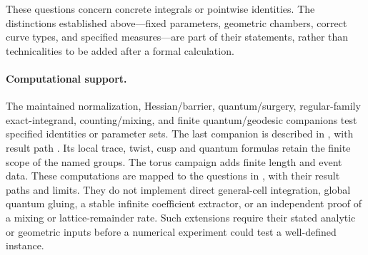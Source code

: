 These questions concern concrete integrals or pointwise identities. The
distinctions established above---fixed parameters, geometric chambers,
correct curve types, and specified measures---are part of their statements,
rather than technicalities to be added after a formal calculation.

\paragraph{Computational support.}
The maintained normalization, Hessian/barrier, quantum/surgery,
regular-family exact-integrand, counting/mixing, and finite
quantum/geodesic companions test specified identities or parameter sets.
The last companion is described in
, with result path
. Its local trace, twist,
cusp and quantum formulas retain the finite scope of the named groups.
The torus campaign adds
finite length and event data. These computations are mapped to the
questions in , with their result
paths and limits. They do not implement direct general-cell integration,
global quantum gluing, a stable infinite coefficient extractor, or an
independent proof of a mixing or lattice-remainder rate. Such extensions
require their stated analytic or geometric inputs before a numerical
experiment could test a well-defined instance.
